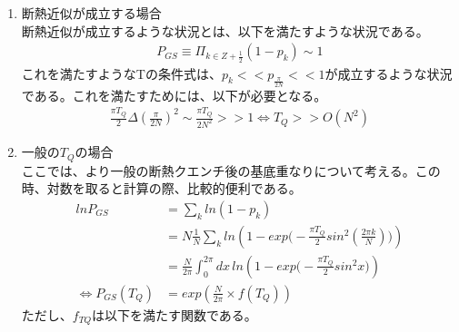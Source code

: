\documentclass[a4paper,10.5pt]{article}
\numberwithin{equation}{section}
\begin{document}
\begin{enumerate}
    \item 断熱近似が成立する場合\\
    断熱近似が成立するような状況とは、以下を満たすような状況である。
    \begin{align*}
        P_{GS}\equiv \Pi_{k\in Z+\frac{1}{2}}(1-p_{k})\sim 1
    \end{align*}
    これを満たすようなTの条件式は、$p_{k}<<p_{\frac{\pi}{2N}}<<1$が成立するような状況である。これを満たすためには、以下が必要となる。
    \begin{align*}
        \frac{\pi T_{Q}}{2}\Delta(\frac{\pi}{2N})^{2}\sim\frac{\pi T_{Q}}{2N^{2}}>>1\iff T_{Q}>>O(N^{2})
    \end{align*}
    
    \item 一般の$T_{Q}$の場合\\
    ここでは、より一般の断熱クエンチ後の基底重なりについて考える。この時、対数を取ると計算の際、比較的便利である。
    \begin{align*}
        lnP_{GS}&=\sum_{k}ln(1-p_{k})\\
        &=N\frac{1}{N}\sum_{k}ln(1-exp\big(-\frac{\pi T_{Q}}{2}sin^{2}(\frac{2\pi k}{N})\big))\\
        &=\frac{N}{2\pi}\int_{0}^{2\pi}dx \,ln(1-exp\big(-\frac{\pi T_{Q}}{2}sin^{2}x\big))\\
        \iff P_{GS}(T_{Q})&=exp(\frac{N}{2\pi}\times f(T_{Q}))
    \end{align*}
    ただし、$f_{TQ}$は以下を満たす関数である。

\end{enumerate}
\end{document}
